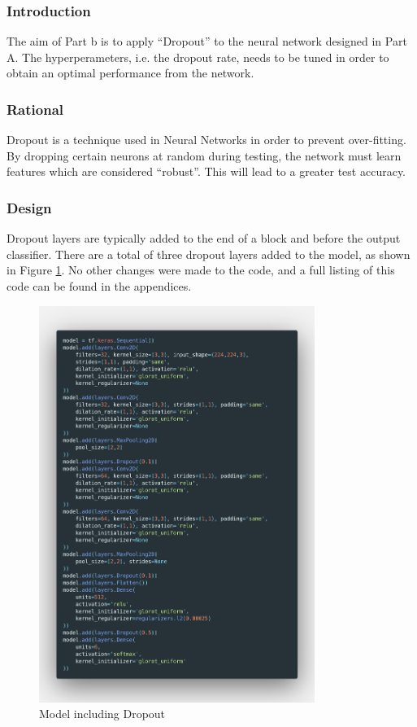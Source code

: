 \subsubsection{Introduction}

The aim of Part b is to apply ``Dropout'' to the neural network designed in Part
A. The hyperperameters, i.e. the dropout rate, needs to be tuned in order to
obtain an optimal performance from the network.

\subsubsection{Rational}

Dropout is a technique used in Neural Networks in order to prevent over-fitting.
By dropping certain neurons at random during testing, the network must learn
features which are considered ``robust''. This will lead to a greater test
accuracy.

\subsubsection{Design}

Dropout layers are typically added to the end of a block and before the output
classifier. There are a
total of three dropout layers added to the model, as shown in Figure
\ref{fig:images-Code-dropout}. No other changes were made to the code, and a
full listing of this code can be found in the appendices.

\begin{figure}[H]
	\centering
	\includegraphics[width=0.8\textwidth]{images/Code/dropout}
	\caption{Model including Dropout}
	\label{fig:images-Code-dropout}
\end{figure}

